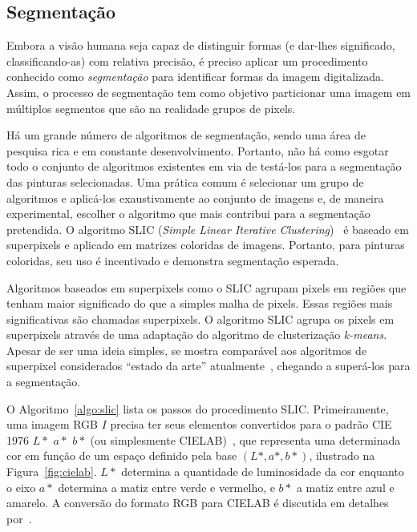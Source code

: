 \subsection{Segmentação}
\label{sec:slic}

Embora a visão humana seja capaz de distinguir formas (e dar-lhes
significado, classificando-as) com relativa precisão, é preciso
aplicar um procedimento conhecido como \emph{segmentação} para
identificar formas da imagem digitalizada. Assim, o processo de
segmentação tem como objetivo particionar uma imagem em múltiplos
segmentos que são na realidade grupos de pixels.

Há um grande número de algoritmos de segmentação, sendo uma área de
pesquisa rica e em constante desenvolvimento. Portanto, não há como
esgotar todo o conjunto de algoritmos existentes em via de testá-los
para a segmentação das pinturas selecionadas. Uma prática comum é
selecionar um grupo de algoritmos e aplicá-los exaustivamente ao
conjunto de imagens e, de maneira experimental, escolher o algoritmo
que mais contribui para a segmentação pretendida. O algoritmo SLIC
(\textit{Simple Linear Iterative Clustering})~\cite{slic} é baseado em
superpixels e aplicado em matrizes coloridas de imagens. Portanto,
para pinturas coloridas, seu uso é incentivado e demonstra segmentação
esperada.

Algoritmos baseados em superpixels como o SLIC agrupam pixels em
regiões que tenham maior significado do que a simples malha de
pixels. Essas regiões mais significativas são chamadas superpixels. O
algoritmo SLIC agrupa os pixels em superpixels através de uma
adaptação do algoritmo de clusterização \emph{k-means}. Apesar de ser
uma ideia simples, se mostra comparável aos algoritmos de superpixel
considerados ``estado da arte'' atualmente~\cite{slic}, chegando a
superá-los para a segmentação.

O Algoritmo~\ref{algo:slic} lista os passos do procedimento
SLIC. Primeiramente, uma imagem RGB $I$ precisa ter seus elementos
convertidos para o padrão CIE 1976 $L*$ $a*$ $b*$ (ou simplesmente
CIELAB)~\cite{cielab1}, que representa uma determinada cor em função
de um espaço definido pela base $(L*, a*, b*)$, ilustrado na
Figura~\ref{fig:cielab}. $L*$ determina a quantidade de luminosidade
da cor enquanto o eixo $a*$ determina a matiz entre verde e vermelho,
e $b*$ a matiz entre azul e amarelo. A conversão do formato RGB para
CIELAB é discutida em detalhes por~\citeauthor{cielab2}.

